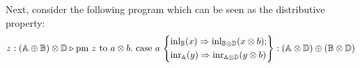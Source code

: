 \begin{example}
Next, consider the following program which can be seen as the distributive property:
\begin{equation*}
  \begin{split}
    z:(\mathbb{A} \oplus \mathbb{\mathbb{B}}) \otimes \mathbb{\mathbb{D}} \triangleright \text{pm } z \text{ to } a \otimes b. \text{ case } a\,\left\{ 
      \begin{aligned}
    &\mathrm{inl}_{\mathbb{B}}(x) \Rightarrow \mathrm{inl}_{\mathbb{B} \otimes \mathbb{D}}(x \otimes b); \\
    & \mathrm{inr}_{\mathbb{A}}(y) \Rightarrow \mathrm{inr}_{\mathbb{A} \otimes \mathbb{D}} (y \otimes b)
      \end{aligned}
    \right\}: (\mathbb{A} \otimes \mathbb{D}) \oplus (\mathbb{B} \otimes \mathbb{D})
\end{split}
\end{equation*}


\end{example}
